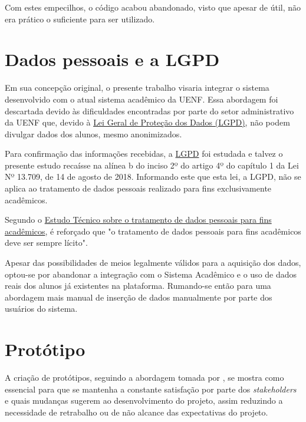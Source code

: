         Com estes empecilhos, o código acabou abandonado, visto que apesar de útil, não era prático o suficiente para ser utilizado.

\section{Dados pessoais e a LGPD} %

    Em sua concepção original, o presente trabalho visaria integrar o sistema desenvolvido com o atual sistema acadêmico da UENF. Essa abordagem foi descartada devido às dificuldades encontradas por parte do setor administrativo da UENF que, devido à \href{https://www.planalto.gov.br/ccivil_03/_ato2015-2018/2018/lei/l13709.htm}{Lei Geral de Proteção dos Dados (LGPD)}, não podem divulgar dados dos alunos, mesmo anonimizados.

    Para confirmação das informações recebidas, a \href{https://www.planalto.gov.br/ccivil_03/_ato2015-2018/2018/lei/l13709.htm}{LGPD} foi estudada e talvez o presente estudo recaísse na alínea b do inciso 2º do artigo 4º do capítulo 1 da Lei Nº 13.709, de 14 de agosto de 2018. Informando este que esta lei, a LGPD, não se aplica ao tratamento de dados pessoais realizado para fins exclusivamente acadêmicos.

    Segundo o \href{https://www.gov.br/anpd/pt-br/assuntos/noticias/sei_00261-000810_2022_17.pdf}{Estudo Técnico sobre o tratamento de dados pessoais para fins acadêmicos}, é reforçado que "o tratamento de dados pessoais para fins acadêmicos deve ser sempre lícito".

    Apesar das possibilidades de meios legalmente válidos para a aquisição dos dados, optou-se por abandonar a integração com o Sistema Acadêmico e o uso de dados reais dos alunos já existentes na plataforma. Rumando-se então para uma abordagem mais manual de inserção de dados manualmente por parte dos usuários do sistema.

\section{Protótipo} %

    A criação de protótipos, seguindo a abordagem tomada por \cite{andre_interaction_2018}, se mostra como essencial para que se mantenha a constante satisfação por parte dos \textit{stakeholders} e quais mudanças sugerem ao desenvolvimento do projeto, assim reduzindo a necessidade de retrabalho ou de não alcance das expectativas do projeto.

